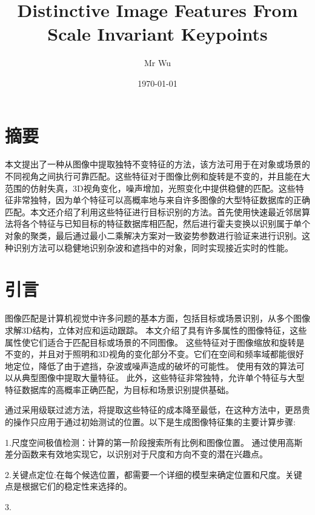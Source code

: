 \documentclass{ctexart}
\title{Distinctive Image Features From Scale Invariant Keypoints}
\author{Mr Wu}
\date{\today}
\begin{document}
	\maketitle
	\section{摘要}
	本文提出了一种从图像中提取独特不变特征的方法，该方法可用于在对象或场景的不同视角之间执行可靠匹配。这些特征对于图像比例和旋转是不变的，并且能在大范围的仿射失真，3D视角变化，噪声增加，光照变化中提供稳健的匹配。这些特征非常独特，因为单个特征可以高概率地与来自许多图像的大型特征数据库的正确匹配。本文还介绍了利用这些特征进行目标识别的方法。首先使用快速最近邻居算法将各个特征与已知目标的特征数据库相匹配，然后进行霍夫变换以识别属于单个对象的聚类，最后通过最小二乘解决方案对一致姿势参数进行验证来进行识别。这种识别方法可以稳健地识别杂波和遮挡中的对象，同时实现接近实时的性能。
	\section{引言}
	图像匹配是计算机视觉中许多问题的基本方面，包括目标或场景识别，从多个图像求解3D结构，立体对应和运动跟踪。 本文介绍了具有许多属性的图像特征，这些属性使它们适合于匹配目标或场景的不同图像。 这些特征对于图像缩放和旋转是不变的，并且对于照明和3D视角的变化部分不变。它们在空间和频率域都能很好地定位，降低了由于遮挡，杂波或噪声造成的破坏的可能性。 使用有效的算法可以从典型图像中提取大量特征。 此外，这些特征非常独特，允许单个特征与大型特征数据库的高概率正确匹配，为目标和场景识别提供基础。
	
	通过采用级联过滤方法，将提取这些特征的成本降至最低，在这种方法中，更昂贵的操作只应用于通过初始测试的位置。以下是生成图像特征集的主要计算步骤:
	
	1.尺度空间极值检测：计算的第一阶段搜索所有比例和图像位置。 通过使用高斯差分函数来有效地实现它，以识别对于尺度和方向不变的潜在兴趣点。
	
	2.关键点定位:在每个候选位置，都需要一个详细的模型来确定位置和尺度。关键点是根据它们的稳定性来选择的。
	
	3.
\end{document}
